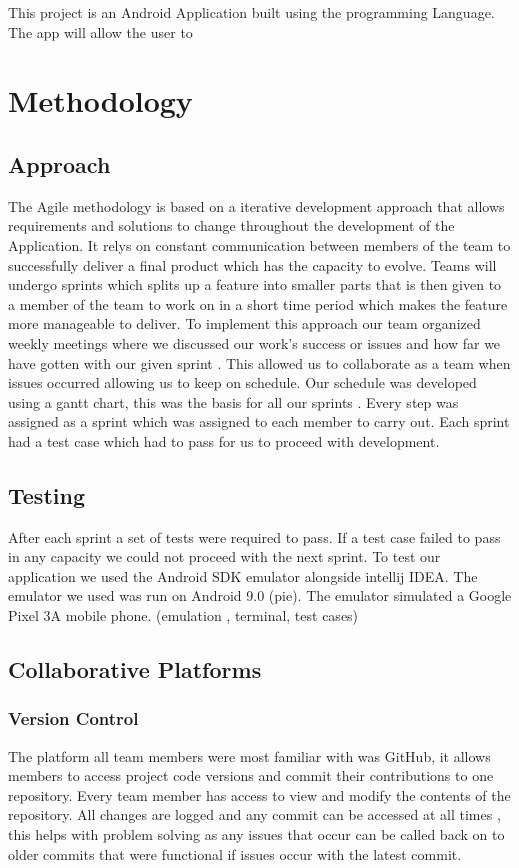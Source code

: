 This project is an Android Application built using the programming Language. The app will allow the user to 
\chapter{Methodology}
\section{Approach}
The Agile methodology is based on a iterative development approach that allows requirements and solutions to change throughout the development of the Application. It relys on constant communication between members of the team to successfully deliver a final product which has the capacity to evolve. Teams will undergo sprints which splits up a feature into smaller parts that is then given to a member of the team to work on in a short time period which makes the feature more manageable to deliver.
\newline
\newline
To implement this approach our team organized weekly meetings where we discussed our work's success or issues and how far we have gotten with our given sprint . This allowed us to collaborate as a team when issues occurred allowing us to keep on schedule. Our schedule was developed using a gantt chart, this was the basis for all our sprints . Every step was assigned as a sprint which was assigned to each member to carry out. Each sprint had a test case which had to pass for us to proceed with development.
\section{Testing}
After each sprint a set of tests were required to pass. If a test case failed to pass in any capacity we could not proceed with the next sprint. To test our application we used  the Android SDK emulator alongside intellij IDEA.
\newline
The emulator we used was run on Android 9.0 (pie). The emulator simulated a Google Pixel 3A mobile phone. 
(emulation , terminal, test cases)
\section{Collaborative Platforms}
\subsection{Version Control}
The platform all team members were most familiar with was GitHub, it allows members to access project code versions and commit their contributions to one repository. Every team member has access to view and modify the contents of the repository. All changes are logged and any commit can be accessed at all times , this helps with problem solving as any issues that occur can be called back on to older commits that were functional if issues occur with the latest commit.

